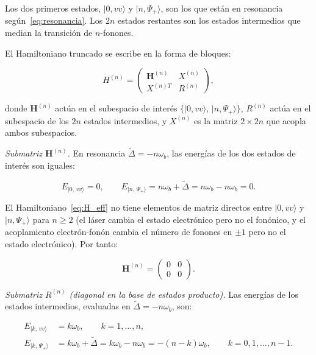 \documentclass[12pt]{article}
\begin{document}
	\noindent
	Los dos primeros estados, $|0, vv\rangle$ y $|n, \Psi_+\rangle$, son los que
	est\'an en resonancia seg\'un~\eqref{eq:resonancia}. Los $2n$ estados restantes
	son los estados intermedios que median la transici\'on de $n$-fonones.
	
	\medskip
	\noindent
	El Hamiltoniano truncado se escribe en la forma de bloques:
	
	\begin{equation}
		H^{(n)} = \begin{pmatrix} \mathbf{H}^{(n)} & X^{(n)} \\[4pt]
			X^{(n)T} & R^{(n)} \end{pmatrix},
		\label{eq:H_bloques}
	\end{equation}
	
	donde $\mathbf{H}^{(n)}$ act\'ua en el subespacio de inter\'es
	$\{|0, vv\rangle,\, |n, \Psi_+\rangle\}$, $R^{(n)}$ act\'ua en el subespacio
	de los $2n$ estados intermedios, y $X^{(n)}$ es la matriz $2\times 2n$ que
	acopla ambos subespacios.
	
	\medskip
	\noindent
	\textit{Submatriz $\mathbf{H}^{(n)}$.}
	En resonancia $\widetilde{\Delta} = -n\omega_b$, las energ\'ias de los dos
	estados de inter\'es son iguales:
	
	\begin{equation}
		E_{|0,\, vv\rangle} = 0, \qquad
		E_{|n,\, \Psi_+\rangle} = n\omega_b + \widetilde{\Delta}
		= n\omega_b - n\omega_b = 0.
	\end{equation}
	
	\noindent
	El Hamiltoniano~\eqref{eq:H_eff} no tiene elementos de matriz directos entre
	$|0, vv\rangle$ y $|n, \Psi_+\rangle$ para $n \geq 2$ (el l\'aser cambia el
	estado electr\'onico pero no el fon\'onico, y el acoplamiento electr\'on-fon\'on
	cambia el n\'umero de fonones en $\pm 1$ pero no el estado electr\'onico). Por
	tanto:
	
	\begin{equation}
		\mathbf{H}^{(n)} = \begin{pmatrix} 0 & 0 \\ 0 & 0 \end{pmatrix}.
	\end{equation}
	
	\noindent
	\textit{Submatriz $R^{(n)}$ (diagonal en la base de estados producto).}
	Las energ\'ias de los estados intermedios, evaluadas en
	$\widetilde{\Delta} = -n\omega_b$, son:
	
	\begin{align}
		E_{|k,\, vv\rangle} &= k\omega_b,
		\qquad k = 1, \ldots, n,
		\label{eq:E_int_vv}\\[4pt]
		E_{|k,\, \Psi_+\rangle} &= k\omega_b + \widetilde{\Delta}
		= k\omega_b - n\omega_b = -(n-k)\omega_b,
		\qquad k = 0, 1, \ldots, n-1.
		\label{eq:E_int_Psi}
	\end{align}
	
\end{document}
